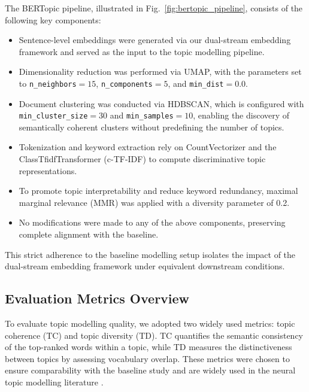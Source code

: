 \documentclass[utf8]{FrontiersinHarvard}
\begin{document}
The BERTopic pipeline, illustrated in Fig.~\ref{fig:bertopic_pipeline}, consists of the following key components:

\begin{itemize}[leftmargin=*,itemsep=2pt]
    \item Sentence-level embeddings were generated via our dual-stream embedding framework and served as the input to the topic modelling pipeline.

    \item Dimensionality reduction was performed via UMAP, with the parameters set to \texttt{n\_neighbors}$=15$, \texttt{n\_components}$=5$, and \texttt{min\_dist}$=0.0$.

    \item Document clustering was conducted via HDBSCAN, which is configured with \texttt{min\_cluster\_size}$=30$ and \texttt{min\_samples}$=10$, enabling the discovery of semantically coherent clusters without predefining the number of topics.

    \item Tokenization and keyword extraction rely on CountVectorizer and the ClassTfidfTransformer (c-TF-IDF) to compute discriminative topic representations.

    \item To promote topic interpretability and reduce keyword redundancy, maximal marginal relevance (MMR) was applied with a diversity parameter of 0.2.

    \item No modifications were made to any of the above components, preserving complete alignment with the baseline.
\end{itemize}

This strict adherence to the baseline modelling setup isolates the impact of the dual-stream embedding framework under equivalent downstream conditions.

\subsection{Evaluation Metrics Overview}
To evaluate topic modelling quality, we adopted two widely used metrics: topic coherence (TC) and topic diversity (TD). TC quantifies the semantic consistency of the top-ranked words within a topic, while TD measures the distinctiveness between topics by assessing vocabulary overlap. These metrics were chosen to ensure comparability with the baseline study \citep{lezhnina_depression_2023} and are widely used in the neural topic modelling literature \citep{dieng_topic_2020,mimno_optimizing_2011,roder_exploring_2015}.
\end{document}
